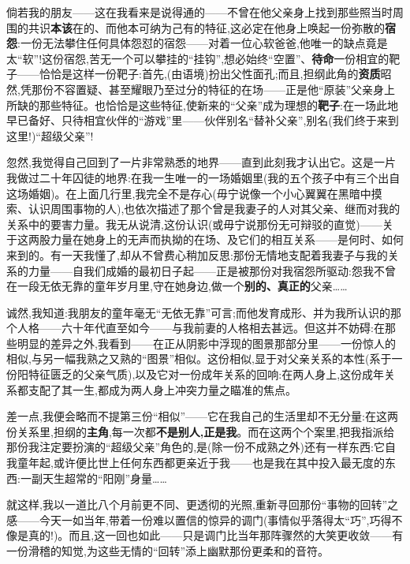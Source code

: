 倘若我的朋友——这在我看来是说得通的——不曾在他父亲身上找到那些照当时周围的共识\textbf{本该}在的、而他本可纳为己有的特征,这必定在他身上唤起一份弥散的\textbf{宿怨}:一份无法攀住任何具体怨怼的宿怨——对着一位心软爸爸,他唯一的缺点竟是太“软”!这份宿怨,苦无一个可以攀挂的“挂钩”,想必始终“空置”、\textbf{待命}一份相宜的靶子——恰恰是这样一份靶子:首先,(由语境)扮出父性面孔;而且,担纲此角的\textbf{资质}昭然,凭那份不容置疑、甚至耀眼乃至过分的特征的在场——正是他“原装”父亲身上所缺的那些特征。也恰恰是这些特征,使新来的“父亲”成为理想的\textbf{靶子}:在一场此地早已备好、只待相宜伙伴的“游戏”里——伙伴别名“替补父亲”,别名(我们终于来到这里!)“超级父亲”!

忽然,我觉得自己回到了一片非常熟悉的地界——直到此刻我才认出它。这是一片我做过二十年囚徒的地界:在我一生唯一的一场婚姻里(我的五个孩子中有三个出自这场婚姻)。在上面几行里,我完全不是存心(毋宁说像一个小心翼翼在黑暗中摸索、认识周围事物的人),也依次描述了那个曾是我妻子的人对其父亲、继而对我的关系中的要害力量。我无从说清,这份认识(或毋宁说那份无可辩驳的直觉)——关于这两股力量在她身上的无声而执拗的在场、及它们的相互关系——是何时、如何来到的。有一天我懂了,却从不曾费心稍加反思:那份无情地支配着我妻子与我的关系的力量——自我们成婚的最初日子起——正是被那份对我宿怨所驱动:怨我不曾在一段无依无靠的童年岁月里,守在她身边,做一个\textbf{别的、真正的}父亲……

\dmark{}诚然,我知道:我朋友的童年毫无“无依无靠”可言;而他发育成形、并为我所认识的那个人格——六十年代直至如今——与我前妻的人格相去甚远。但这并不妨碍:在那些明显的差异之外,我看到——在正从阴影中浮现的图景那部分里——一份惊人的相似,与另一幅我熟之又熟的“图景”相似。这份相似,显于对父亲关系的本性(系于一份阳特征匮乏的父亲气质),以及它对一份成年关系的回响:在两人身上,这份成年关系都支配了其一生,都成为两人身上冲突力量之瞄准的焦点。

差一点,我便会略而不提第三份“相似”——它在我自己的生活里却不无分量:在这两份关系里,担纲的\textbf{主角},每一次都\textbf{不是别人,正是我}。而在这两个个案里,把我指派给那份我注定要扮演的“超级父亲”角色的,是(除一份不成熟之外)还有一样东西:它自我童年起,或许便比世上任何东西都更亲近于我——也是我在其中投入最无度的东西:一副天生超常的“阳刚”身量……

就这样,我以一道比八个月前更不同、更透彻的光照,重新寻回那份“事物的回转”之感——今天一如当年,带着一份难以置信的惊异的调门(事情似乎落得太“巧”,巧得不像是真的!)。而且,这一回也如此——只是调门比当年那阵骤然的大笑更收敛——有一份滑稽的知觉,为这些无情的“回转”添上幽默那份更柔和的音符。

